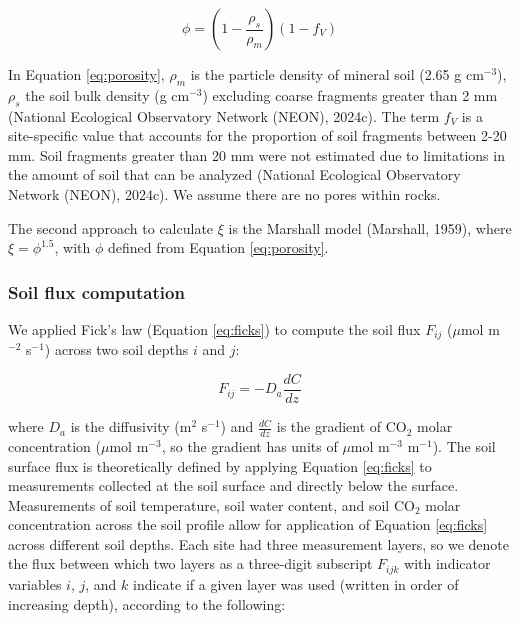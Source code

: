 \documentclass[
  letterpaper,
  DIV=11,
  numbers=noendperiod]{scrartcl}
\begin{document}
\begin{equation}
  \phi = \left(1- \frac{\rho_{s}}{\rho_{m}} \right) \left(1-f_{V}\right)
  \label{eq:porosity}
\end{equation}

In Equation \ref{eq:porosity}, \(\rho_{m}\) is the particle density of
mineral soil (2.65 g cm\(^{-3}\)), \(\rho_{s}\) the soil bulk density (g
cm\(^{-3}\)) excluding coarse fragments greater than 2 mm (National
Ecological Observatory Network (NEON), 2024c). The term \(f_{V}\) is a
site-specific value that accounts for the proportion of soil fragments
between 2-20 mm. Soil fragments greater than 20 mm were not estimated
due to limitations in the amount of soil that can be analyzed (National
Ecological Observatory Network (NEON), 2024c). We assume there are no
pores within rocks.

The second approach to calculate \(\xi\) is the Marshall model
(Marshall, 1959), where \(\xi = \phi^{1.5}\), with \(\phi\) defined from
Equation \ref{eq:porosity}.

\subsubsection{Soil flux computation}\label{sec-compute-soil-flux}

We applied Fick's law (Equation \ref{eq:ficks}) to compute the soil flux
\(F_{ij}\) (\(\mu\)mol m\(^{-2}\) s\(^{-1}\)) across two soil depths
\(i\) and \(j\):

\begin{equation}
  F_{ij} = -D_{a} \frac{dC}{dz}
  \label{eq:ficks}
\end{equation}

where \(D_{a}\) is the diffusivity (m\(^{2}\) s\(^{-1}\)) and
\(\frac{dC}{dz}\) is the gradient of CO\(_{2}\) molar concentration
(\(\mu\)mol m\(^{-3}\), so the gradient has units of \(\mu\)mol
m\(^{-3}\) m\(^{-1}\)). The soil surface flux is theoretically defined
by applying Equation \ref{eq:ficks} to measurements collected at the
soil surface and directly below the surface. Measurements of soil
temperature, soil water content, and soil CO\(_{2}\) molar concentration
across the soil profile allow for application of Equation \ref{eq:ficks}
across different soil depths. Each site had three measurement layers, so
we denote the flux between which two layers as a three-digit subscript
\(F_{ijk}\) with indicator variables \(i\), \(j\), and \(k\) indicate if
a given layer was used (written in order of increasing depth), according
to the following:
\end{document}

